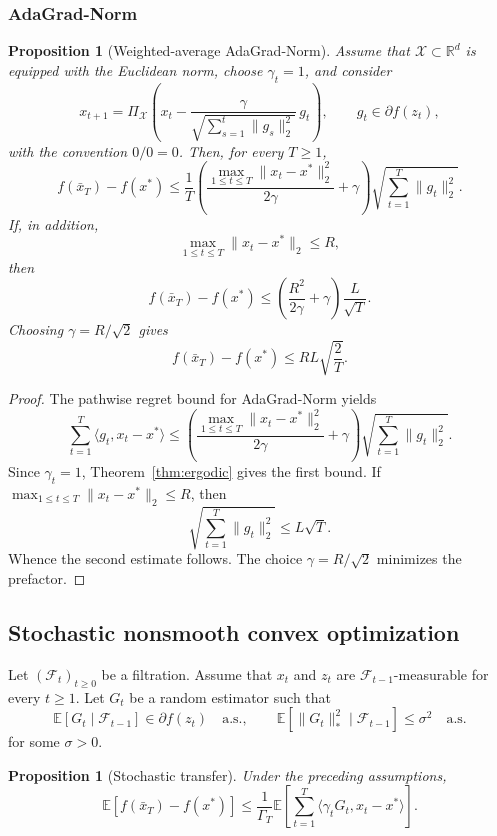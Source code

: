 \documentclass[11pt]{article}
\newtheorem{proposition}[theorem]{Proposition}
\theoremstyle{definition}
\theoremstyle{remark}
\newcommand{\R}{\mathbb{R}}
\newcommand{\X}{\mathcal{X}}
\newcommand{\E}{\mathbb{E}}
\newcommand{\inner}[2]{\langle #1, #2 \rangle}
\newcommand{\norm}[1]{\lVert #1 \rVert}
\newcommand{\normdual}[1]{\lVert #1 \rVert_*}
\begin{document}
\subsubsection{AdaGrad-Norm}

\begin{proposition}[Weighted-average AdaGrad-Norm]
\label{prop:adagrad}
Assume that $\X \subset \R^d$ is equipped with the Euclidean norm, choose $\gamma_t=1$, and consider
\[
    x_{t+1}
    =
    \Pi_{\X}\left(
        x_t - \frac{\gamma}{\sqrt{\sum_{s=1}^t \norm{g_s}_2^2}}\,g_t
    \right),
    \qquad
    g_t \in \partial f(z_t),
\]
with the convention $0/0=0$. Then, for every $T\ge 1$,
\[
    f(\bar{x}_T)-f(x^*)
    \le
    \frac{1}{T}
    \left(
        \frac{\max_{1\le t\le T} \norm{x_t-x^*}_2^2}{2\gamma} + \gamma
    \right)
    \sqrt{\sum_{t=1}^T \norm{g_t}_2^2}.
\]
If, in addition,
\[
    \max_{1\le t\le T} \norm{x_t-x^*}_2 \le R,
\]
then
\[
    f(\bar{x}_T)-f(x^*)
    \le
    \left(
        \frac{R^2}{2\gamma} + \gamma
    \right)\frac{L}{\sqrt{T}}.
\]
Choosing $\gamma = R/\sqrt{2}$ gives
\[
    f(\bar{x}_T)-f(x^*) \le RL\sqrt{\frac{2}{T}}.
\]
\end{proposition}

\begin{proof}
The pathwise regret bound for AdaGrad-Norm yields
\[
    \sum_{t=1}^T \inner{g_t}{x_t-x^*}
    \le
    \left(
        \frac{\max_{1\le t\le T} \norm{x_t-x^*}_2^2}{2\gamma} + \gamma
    \right)
    \sqrt{\sum_{t=1}^T \norm{g_t}_2^2}.
\]
Since $\gamma_t=1$, Theorem~\ref{thm:ergodic} gives the first bound. If $\max_{1\le t\le T} \norm{x_t-x^*}_2 \le R$, then
\[
    \sqrt{\sum_{t=1}^T \norm{g_t}_2^2} \le L\sqrt{T}.
\]
Whence the second estimate follows. The choice $\gamma = R/\sqrt{2}$ minimizes the prefactor.
\end{proof}

\subsection{Stochastic nonsmooth convex optimization}
\label{sec:stochastic}

Let $(\mathcal{F}_t)_{t\ge 0}$ be a filtration. Assume that $x_t$ and $z_t$ are $\mathcal{F}_{t-1}$-measurable for every $t\ge 1$. Let $G_t$ be a random estimator such that
\[
    \E[G_t \mid \mathcal{F}_{t-1}] \in \partial f(z_t)
    \quad\text{a.s.},
    \qquad
    \E[\normdual{G_t}^2 \mid \mathcal{F}_{t-1}] \le \sigma^2
    \quad\text{a.s.}
\]
for some $\sigma>0$.

\begin{proposition}[Stochastic transfer]
\label{prop:stochastic-transfer}
Under the preceding assumptions,
\[
    \E[f(\bar{x}_T)-f(x^*)]
    \le
    \frac{1}{\Gamma_T}
    \E\left[
        \sum_{t=1}^T \inner{\gamma_t G_t}{x_t-x^*}
    \right].
\]
\end{proposition}
\end{document}
